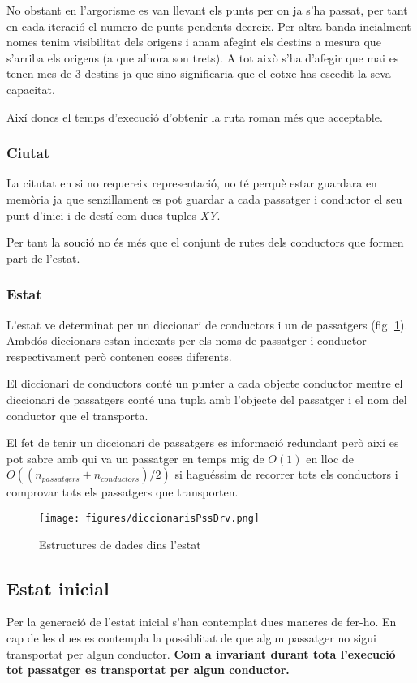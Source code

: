 No obstant en l'argorisme es van llevant els punts per on ja s'ha passat, per tant
en cada iteració el numero de punts pendents decreix. Per altra banda incialment nomes tenim
visibilitat dels origens i anam afegint els destins a mesura que s'arriba els origens (a que alhora son trets).
A tot això s'ha d'afegir que mai es tenen mes de 3 destins ja que sino significaria
que el cotxe has escedit la seva capacitat.

Així doncs el temps d'execució d'obtenir la ruta roman més que acceptable.

\subsubsection{Ciutat}
La citutat en si no requereix representació, no té perquè estar guardara en memòria ja que senzillament
es pot guardar a cada passatger i conductor el seu punt d'inici i de destí com dues tuples \emph{XY}.

Per tant la so\lgem ució no és més que el conjunt de rutes dels conductors que formen part de l'estat.

\subsubsection{Estat}
L'estat ve determinat per un diccionari de conductors i un de passatgers (fig. \ref{diccionarisPssDrv}).
Ambdós diccionars estan indexats per els noms de passatger i conductor respectivament però contenen coses diferents.

El diccionari de conductors conté un punter a cada objecte conductor mentre el diccionari
de passatgers conté una tupla amb l'objecte del passatger i el nom del conductor que el transporta.

El fet de tenir un diccionari de passatgers es informació redundant però així es pot sabre
amb qui va un passatger en temps mig de $O(1)$ en lloc de $O((n_{passatgers} + n_{conductors})/2)$ 
si haguéssim de recorrer tots els conductors i comprovar tots els passatgers que transporten.

\begin{figure}[H]
\begin{center}
 \texttt{[image: figures/diccionarisPssDrv.png]}
 \caption{Estructures de dades dins l'estat}
 \label{diccionarisPssDrv}
\end{center}
\end{figure}


\subsection{Estat inicial}
Per la generació de l'estat inicial s'han contemplat dues maneres de fer-ho. En cap de les dues es contempla
la possiblitat de que algun passatger no sigui transportat per algun conductor. \textbf{Com a invariant durant
tota l'execució tot passatger es transportat per algun conductor.}

